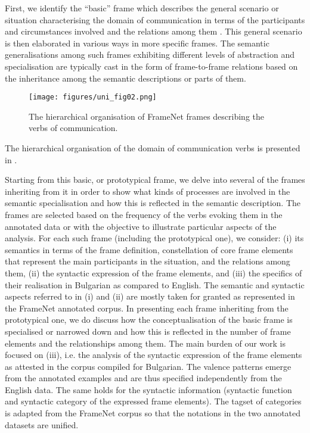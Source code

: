 \documentclass[output=paper,colorlinks,citecolor=brown]{langscibook}
\begin{document}
First, we identify the ``basic'' frame which describes the general scenario or situation characterising the domain of communication in terms of the participants and circumstances involved and the relations among them \citep[16]{Johnson2001}. This general scenario is then elaborated in various ways in more specific frames. The semantic generalisations among such frames exhibiting different levels of abstraction and specialisation are typically cast in the form of frame-to-frame relations based on the inheritance among the semantic descriptions or parts of them. 


\begin{figure} 
\texttt{[image: figures/uni\_fig02.png]}
\caption{The hierarchical organisation of FrameNet frames describing the verbs of communication.}\label{fig:hierarchy}
\end{figure}



The hierarchical organisation of the domain of communication verbs is presented in .


Starting from this basic, or prototypical frame, we delve into several of the frames inheriting from it in order to show what kinds of processes are involved in the semantic specialisation and how this is reflected in the semantic description. The frames are selected based on the frequency of the verbs evoking them in the annotated data or with the objective to illustrate particular aspects of the analysis. For each such frame (including the prototypical one), we consider: (i) its semantics in terms of the frame definition, constellation of core frame elements that represent the main participants in the situation, and the relations among them, (ii) the syntactic expression of the frame elements, and (iii) the specifics of their realisation in Bulgarian as compared to English. The semantic and syntactic aspects referred to in (i) and (ii) are mostly taken for granted as represented in the FrameNet annotated corpus. In presenting each frame inheriting from the prototypical one, we do discuss how the conceptualisation of the basic frame is specialised or narrowed down and how this is reflected in the number of frame elements and the relationships among them. The main burden of our work is focused on (iii), i.e. the analysis of the syntactic expression of the frame elements as attested in the corpus compiled for Bulgarian. The valence patterns emerge from the annotated examples and are thus specified independently from the English data. The same holds for the syntactic information (syntactic function and syntactic category of the expressed frame elements). The tagset of categories is adapted from the FrameNet corpus so that the notations in the two annotated datasets are unified. 
\end{document}
